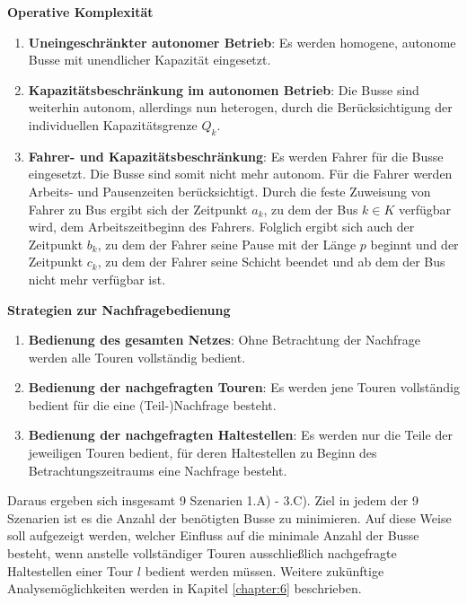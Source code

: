 \textbf{Operative Komplexität}
\begin{enumerate}
    \item \textbf{Uneingeschränkter autonomer Betrieb}: Es werden homogene, autonome Busse mit unendlicher Kapazität eingesetzt.
    \item \textbf{Kapazitätsbeschränkung im autonomen Betrieb}: Die Busse sind weiterhin autonom, allerdings nun heterogen, durch die Berücksichtigung der individuellen Kapazitätsgrenze $Q_k$.
    \item \textbf{Fahrer- und Kapazitätsbeschränkung}: Es werden Fahrer für die Busse eingesetzt. Die Busse sind somit nicht mehr autonom. Für die Fahrer werden Arbeits- und Pausenzeiten berücksichtigt. Durch die feste Zuweisung von Fahrer zu Bus ergibt sich der Zeitpunkt $a_k$, zu dem der Bus $k \in K$ verfügbar wird, dem Arbeitszeitbeginn des Fahrers. Folglich ergibt sich auch der Zeitpunkt $b_k$, zu dem der Fahrer seine Pause mit der Länge $p$ beginnt und der Zeitpunkt $c_k$, zu dem der Fahrer seine Schicht beendet und ab dem der Bus nicht mehr verfügbar ist. 
\end{enumerate}
\textbf{Strategien zur Nachfragebedienung}
\begin{enumerate}[label=\Alph*)]
    \item \textbf{Bedienung des gesamten Netzes}: Ohne Betrachtung der Nachfrage werden alle Touren vollständig bedient.
    \item \textbf{Bedienung der nachgefragten Touren}: Es werden jene Touren vollständig bedient für die eine (Teil-)Nachfrage besteht.
    \item \textbf{Bedienung der nachgefragten Haltestellen}: Es werden nur die Teile der jeweiligen Touren bedient, für deren Haltestellen zu Beginn des Betrachtungszeitraums eine Nachfrage besteht.
\end{enumerate}

Daraus ergeben sich insgesamt 9 Szenarien 1.A) - 3.C). Ziel in jedem der 9 Szenarien ist es die Anzahl der benötigten Busse zu minimieren. Auf diese Weise soll aufgezeigt werden, welcher Einfluss auf die minimale Anzahl der Busse besteht, wenn anstelle vollständiger Touren ausschließlich nachgefragte Haltestellen einer Tour $l$ bedient werden müssen.
Weitere zukünftige Analysemöglichkeiten werden in Kapitel \ref{chapter:6} beschrieben.

